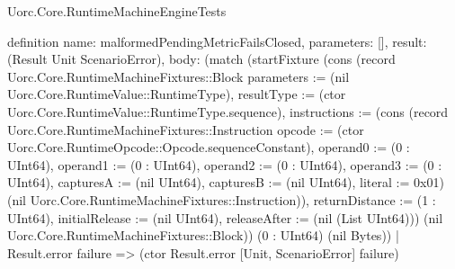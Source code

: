 \begin{lexlean}{Uorc.Core.RuntimeMachineEngineTests}
\begin{semanticmodule}
definition{
  name: malformedPendingMetricFailsClosed,
  parameters: [],
  result: (Result Unit ScenarioError),
  body: (match (startFixture (cons (record Uorc.Core.RuntimeMachineFixtures::Block {parameters := (nil Uorc.Core.RuntimeValue::RuntimeType), resultType := (ctor Uorc.Core.RuntimeValue::RuntimeType.sequence), instructions := (cons (record Uorc.Core.RuntimeMachineFixtures::Instruction {opcode := (ctor Uorc.Core.RuntimeOpcode::Opcode.sequenceConstant), operand0 := (0 : UInt64), operand1 := (0 : UInt64), operand2 := (0 : UInt64), operand3 := (0 : UInt64), capturesA := (nil UInt64), capturesB := (nil UInt64), literal := 0x01}) (nil Uorc.Core.RuntimeMachineFixtures::Instruction)), returnDistance := (1 : UInt64), initialRelease := (nil UInt64), releaseAfter := (nil (List UInt64))}) (nil Uorc.Core.RuntimeMachineFixtures::Block)) (0 : UInt64) (nil Bytes))
    | Result.error failure => (ctor Result.error [Unit, ScenarioError] failure)
}
\end{semanticmodule}
\end{lexlean}
